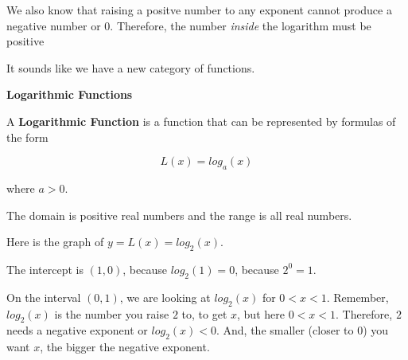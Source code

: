 \documentclass{ximera}
\begin{document}
We also know that raising a positve number to any exponent cannot produce a negative number or $0$.  Therefore, the number \textit{inside} the logarithm must be positive



It sounds like we have a new category of functions.




\begin{definition} \textbf{\textcolor{green!50!black}{Logarithmic Functions}}

A \textbf{Logarithmic Function} is a function that can be represented by formulas of the form

\[     L(x) =    log_a(x)            \]

where $a > 0$.

The domain is positive real numbers and the range is all real numbers.

\end{definition}








\begin{example}

Here is the graph of $y = L(x) = log_2(x)$.

\begin{image}
\end{image}


The intercept is $(1,0)$, because $log_2(1) = 0$, because $2^0 = 1$.

On the interval $(0,1)$, we are looking at $log_2(x)$ for $0<x<1$.  Remember, $log_2(x)$ is the number you raise $2$ to, to get $x$, but here $0<x<1$.  Therefore, $2$ needs a negative exponent or $log_2(x) < 0$.  And, the smaller (closer to $0$) you want $x$, the bigger the negative exponent.





\end{example}
\end{document}
